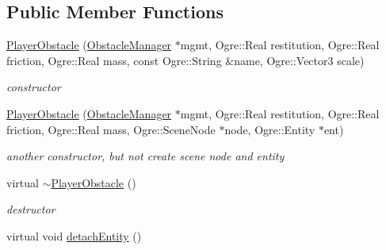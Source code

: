 \subsection*{Public Member Functions}
\begin{DoxyCompactItemize}
\item 
\hyperlink{class_n_c_t_u_1_1_player_obstacle_a983a5de655a8b5aefcae4ae295b68bb5}{Player\+Obstacle} (\hyperlink{class_n_c_t_u_1_1_obstacle_manager}{Obstacle\+Manager} $\ast$mgmt, Ogre\+::\+Real restitution, Ogre\+::\+Real friction, Ogre\+::\+Real mass, const Ogre\+::\+String \&name, Ogre\+::\+Vector3 scale)\hypertarget{class_n_c_t_u_1_1_player_obstacle_a983a5de655a8b5aefcae4ae295b68bb5}{}\label{class_n_c_t_u_1_1_player_obstacle_a983a5de655a8b5aefcae4ae295b68bb5}

\begin{DoxyCompactList}\small\item\em constructor \end{DoxyCompactList}\item 
\hyperlink{class_n_c_t_u_1_1_player_obstacle_aa5fd634767396aeb5c2a8c26931de7bb}{Player\+Obstacle} (\hyperlink{class_n_c_t_u_1_1_obstacle_manager}{Obstacle\+Manager} $\ast$mgmt, Ogre\+::\+Real restitution, Ogre\+::\+Real friction, Ogre\+::\+Real mass, Ogre\+::\+Scene\+Node $\ast$node, Ogre\+::\+Entity $\ast$ent)\hypertarget{class_n_c_t_u_1_1_player_obstacle_aa5fd634767396aeb5c2a8c26931de7bb}{}\label{class_n_c_t_u_1_1_player_obstacle_aa5fd634767396aeb5c2a8c26931de7bb}

\begin{DoxyCompactList}\small\item\em another constructor, but not create scene node and entity \end{DoxyCompactList}\item 
virtual \hyperlink{class_n_c_t_u_1_1_player_obstacle_a6e1139ba9e43ed6158103ff215e25cd8}{$\sim$\+Player\+Obstacle} ()\hypertarget{class_n_c_t_u_1_1_player_obstacle_a6e1139ba9e43ed6158103ff215e25cd8}{}\label{class_n_c_t_u_1_1_player_obstacle_a6e1139ba9e43ed6158103ff215e25cd8}

\begin{DoxyCompactList}\small\item\em destructor \end{DoxyCompactList}\item 
virtual void \hyperlink{class_n_c_t_u_1_1_player_obstacle_a91a946ed66165c94c7cc913b6a9cfe3f}{detach\+Entity} ()\hypertarget{class_n_c_t_u_1_1_player_obstacle_a91a946ed66165c94c7cc913b6a9cfe3f}{}\label{class_n_c_t_u_1_1_player_obstacle_a91a946ed66165c94c7cc913b6a9cfe3f}


\end{DoxyCompactItemize}
